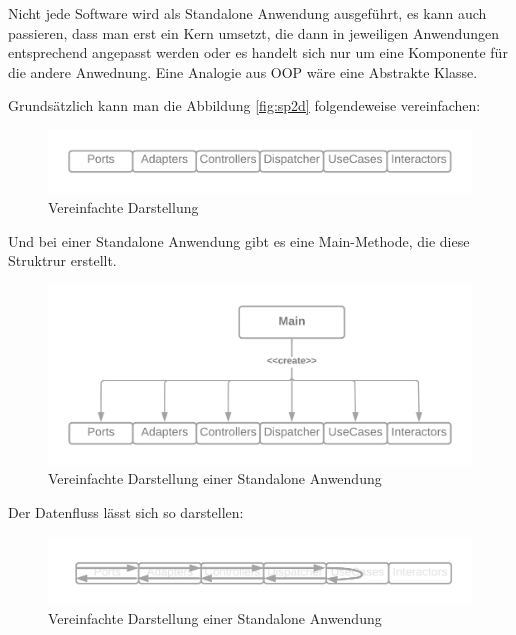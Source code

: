 Nicht jede Software wird als Standalone Anwendung ausgeführt, es kann auch passieren, dass man 
erst ein Kern umsetzt, die dann in jeweiligen Anwendungen entsprechend angepasst werden 
oder es handelt sich nur um eine Komponente für die andere Anwednung.
Eine Analogie aus OOP wäre eine Abstrakte Klasse.

Grundsätzlich kann man die Abbildung \ref{fig:sp2d} folgendeweise vereinfachen:
\begin{figure}[H]
    \centering
    \includegraphics[width=1\textwidth]{./images/SimpliedArchitecture.png}
    \caption{Vereinfachte Darstellung}
    \label{fig:SimpliedArchitecture}
\end{figure}

Und bei einer Standalone Anwendung gibt es eine Main-Methode, die diese Struktrur erstellt.
\begin{figure}[H]
    \centering
    \includegraphics[width=1\textwidth]{./images/Architecture as Standalone.png}
    \caption{Vereinfachte Darstellung einer Standalone Anwendung}
    \label{fig:SimpliedArchitectureAsStandalone}
\end{figure}

Der Datenfluss lässt sich so darstellen:
\begin{figure}[H]
    \centering
    \includegraphics[width=1\textwidth]{./images/Dataflow.png}
    \caption{Vereinfachte Darstellung einer Standalone Anwendung}
    \label{fig:SimpliedArchitectureDataflow}
\end{figure}

